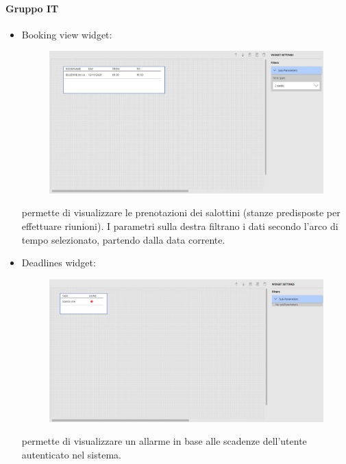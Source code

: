 \paragraph{Gruppo IT}
\begin{itemize}
    \item Booking view widget: 

\begin{figure}[ht]
\centering
\includegraphics[scale=0.32]{images/BookingView.JPG}
\end{figure}
permette di visualizzare le prenotazioni dei salottini (stanze predisposte per effettuare riunioni). I parametri sulla destra filtrano i dati secondo l'arco di tempo selezionato, partendo dalla data corrente.
\end{itemize}
\pagebreak
\begin{itemize}
    \item Deadlines widget: 
    
\begin{figure}[ht]
\centering
\includegraphics[scale=0.35]{images/Deadlines.png}
\end{figure}
permette di visualizzare un allarme in base alle scadenze dell'utente autenticato nel sistema.
\end{itemize}
